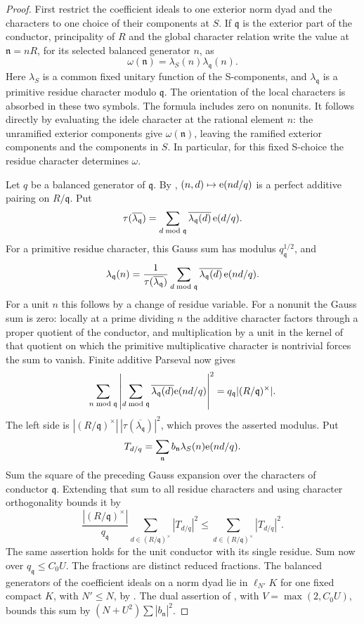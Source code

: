 \begin{proof}
First restrict the coefficient ideals to one exterior norm dyad and the
characters to one choice of their components at \(S\).  If
\(\mathfrak q\) is the exterior part of the conductor, principality of
\(R\) and the global character relation write the value at
\(\mathfrak n=nR\), for its selected balanced generator \(n\), as
\[
 \omega(\mathfrak n)=\lambda_S(n)\lambda_{\mathfrak q}(n).
\]
Here \(\lambda_S\) is a common fixed unitary function of the
S-components, and \(\lambda_{\mathfrak q}\) is a primitive residue
character modulo \(\mathfrak q\).  The orientation of the local
characters is absorbed in these two symbols.  The formula includes zero
on nonunits.  It follows directly by evaluating the idele character at
the rational element \(n\): the unramified exterior components give
\(\omega(\mathfrak n)\), leaving the ramified exterior components and
the components in \(S\).  In particular, for this fixed S-choice the
residue character determines \(\omega\).

Let \(q\) be a balanced generator of \(\mathfrak q\).  By
, \((n,d)\mapsto\mathrm{e}(nd/q)\) is a perfect additive
pairing on \(R/\mathfrak q\).  Put
\[
 \tau(\overline{\lambda_{\mathfrak q}})
   =\sum_{d\bmod\mathfrak q}
          \overline{\lambda_{\mathfrak q}(d)}\,\mathrm{e}(d/q).
\]
For a primitive residue character, this Gauss sum has modulus
\(q_{\mathfrak q}^{1/2}\), and
\[
 \lambda_{\mathfrak q}(n)=
 \frac1{\tau(\overline{\lambda_{\mathfrak q}})}
       \sum_{d\bmod\mathfrak q}
       \overline{\lambda_{\mathfrak q}(d)}\,\mathrm{e}(nd/q).
\]
For a unit \(n\) this follows by a change of residue variable.  For a
nonunit the Gauss sum is zero: locally at a prime dividing \(n\) the
additive character factors through a proper quotient of the conductor,
and multiplication by a unit in the kernel of that quotient on which
the primitive multiplicative character is nontrivial forces the sum to
vanish.  Finite additive Parseval now gives
\[
 \sum_{n\bmod\mathfrak q}
 \left|\sum_{d\bmod\mathfrak q}
       \overline{\lambda_{\mathfrak q}(d)}\mathrm{e}(nd/q)\right|^2
       =q_{\mathfrak q}|(R/\mathfrak q)^\times|.
\]
The left side is
\(|(R/\mathfrak q)^\times|\,|\tau(\overline{\lambda_{\mathfrak q}})|^2\),
which proves the asserted modulus.  Put
\[
 T_{d/q}=\sum_{\mathfrak n}b_{\mathfrak n}\lambda_S(n)\mathrm{e}(nd/q).
\]
Sum the square of the preceding Gauss expansion over the characters of
conductor \(\mathfrak q\).  Extending that sum to all residue characters
and using character orthogonality bounds it by
\[
 \frac{|(R/\mathfrak q)^\times|}{q_{\mathfrak q}}
       \sum_{d\in(R/\mathfrak q)^\times}|T_{d/q}|^2
 \le \sum_{d\in(R/\mathfrak q)^\times}|T_{d/q}|^2 .
\]
The same assertion holds for the unit conductor with its single residue.
Sum now over \(q_{\mathfrak q}\le C_0U\).
The fractions are distinct reduced fractions.  The balanced generators
of the coefficient ideals on a norm dyad lie in \(\ell_{N'}K\) for one
fixed compact \(K\), with \(N'\le N\), by
.  The dual assertion of
, with \(V=\max(2,C_0U)\), bounds this sum by
\((N+U^2)\sum|b_{\mathfrak n}|^2\).


\end{proof}
